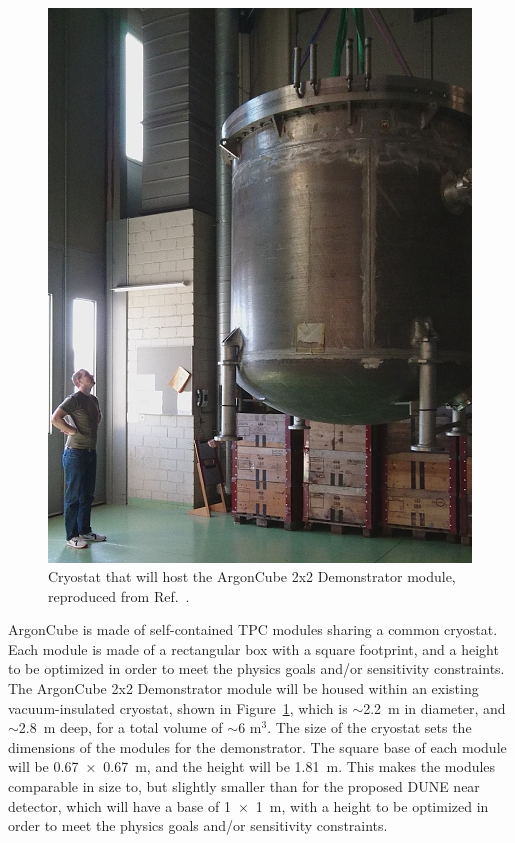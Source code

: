 \begin{figure}[htbp]
\centering
\includegraphics[width=0.45\linewidth]{plots/cryostat.png}
\caption{Cryostat that will host the ArgonCube 2x2 Demonstrator module, reproduced from Ref.~\cite{argoncube_loi}.}
\label{fig:2x2_cryostat}
\end{figure}
ArgonCube is made of self-contained TPC modules sharing a common cryostat. Each module is made of a rectangular box with a square footprint, and a height to be optimized in order to meet the physics goals and/or sensitivity constraints. The ArgonCube 2x2 Demonstrator module will be housed within an existing vacuum-insulated cryostat, shown in Figure~\ref{fig:2x2_cryostat}, which is $\sim$\SI{2.2}{\metre} in diameter, and $\sim$\SI{2.8}{\metre} deep, for a total volume of $\sim$6 m$^3$. The size of the cryostat sets the dimensions of the modules for the demonstrator. The square base of each module will be \SI{0.67 x 0.67}{\metre}, and the height will be \SI{1.81}{\metre}. This makes the modules comparable in size to, but slightly smaller than for the proposed DUNE near detector, which will have a base of \SI{1 x 1}{\metre}, with a height to be optimized in order to meet the physics goals and/or sensitivity constraints.

